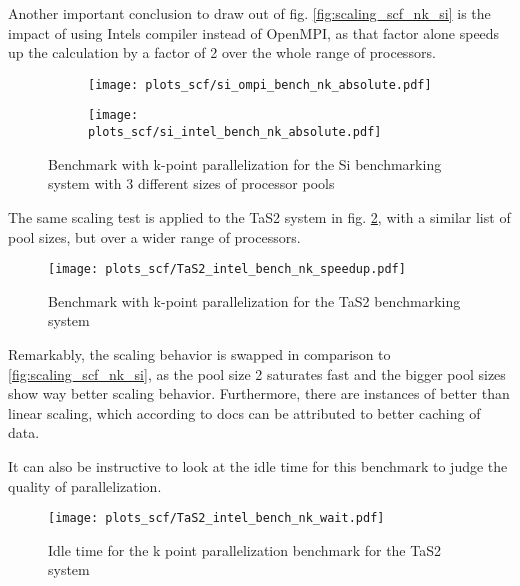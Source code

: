 \documentclass[main.tex]{subfiles}
\begin{document}

Another important conclusion to draw out of fig. \ref{fig:scaling_scf_nk_si} is the impact of using Intels compiler instead of OpenMPI, as that factor alone speeds up the calculation by a factor of 2 over the whole range of processors.

\begin{figure}[ht!]
\begin{subfigure}[b]{0.49\textwidth}
    \centering
    \texttt{[image: plots\_scf/si\_ompi\_bench\_nk\_absolute.pdf]}
\end{subfigure}
\begin{subfigure}[b]{0.49\textwidth}
    \centering
    \texttt{[image: plots\_scf/si\_intel\_bench\_nk\_absolute.pdf]}
\end{subfigure}
\caption{Benchmark with k-point parallelization for the Si benchmarking system with 3 different sizes of processor pools}
\label{fig:scaling_scf_nk_si_absolute}
\end{figure}

The same scaling test is applied to the TaS2 system in fig. \ref{fig:scaling_scf_nk_tas2}, with a similar list of pool sizes, but over a wider range of processors.

\begin{figure}[ht!]
    \centering
    \texttt{[image: plots\_scf/TaS2\_intel\_bench\_nk\_speedup.pdf]}
    \caption{Benchmark with k-point parallelization for the TaS2 benchmarking system}
    \label{fig:scaling_scf_nk_tas2}
\end{figure}

Remarkably, the scaling behavior is swapped in comparison to \ref{fig:scaling_scf_nk_si}, as the pool size 2 saturates fast and the bigger pool sizes show way better scaling behavior.
Furthermore, there are instances of better than linear scaling, which according to \QE docs can be attributed to better caching of data.

It can also be instructive to look at the idle time for this benchmark to judge the quality of parallelization. 

\begin{figure}[ht!]
    \centering
    \texttt{[image: plots\_scf/TaS2\_intel\_bench\_nk\_wait.pdf]}
    \caption{Idle time for the k point parallelization benchmark for the TaS2 system}
    \label{fig:scaling_scf_nk_tas2_wait}
\end{figure}
\end{document}
